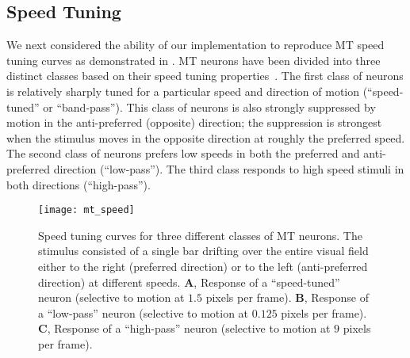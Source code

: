 \subsection{Speed Tuning}
\label{sec:MT|results|speed}
We next considered the ability of our implementation to
reproduce \ac{MT} speed tuning curves as demonstrated in
\cite{SimoncelliHeeger1998}. \ac{MT} neurons have been divided
into three distinct classes based on their speed tuning 
properties~\citep{RodmanAlbright1987}.
The first class of neurons is
relatively sharply tuned for a particular speed and direction of
motion (``speed-tuned'' or ``band-pass''). This class of neurons
is also strongly suppressed by motion in the anti-preferred
(opposite) direction; the suppression is strongest when the
stimulus moves in the opposite direction at roughly the preferred
speed. The second class of neurons prefers low speeds
in both the preferred and anti-preferred direction (``low-pass'').
The third class responds to high speed stimuli in both directions
(``high-pass'').

\begin{figure}[t]
  \centering
  \texttt{[image: mt\_speed]}
  \caption{
  Speed tuning curves for three different classes of \ac{MT} neurons.
  The stimulus consisted of a single bar drifting over the entire 
  visual field either to the right (preferred direction) or to the 
  left (anti-preferred direction) at different speeds.
  $\mathbf{A}$, Response of a ``speed-tuned'' neuron (selective to 
  motion at $1.5$ pixels per frame). 
  $\mathbf{B}$, Response of a ``low-pass'' neuron (selective to motion 
  at $0.125$ pixels per frame).
  $\mathbf{C}$, Response of a ``high-pass'' neuron (selective to 
  motion at $9$ pixels per frame).}
  \label{fig:MT|speed}
\end{figure}

